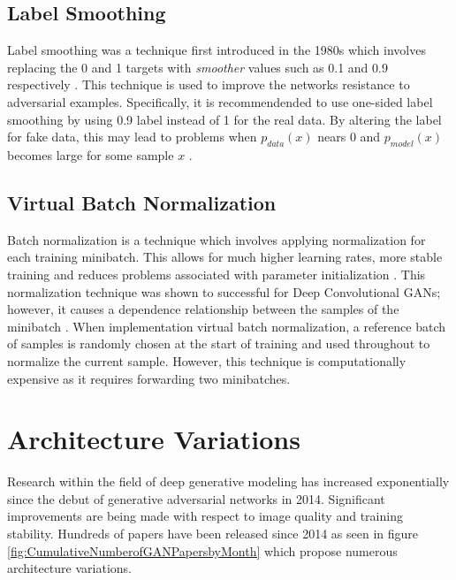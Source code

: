 \documentclass[11pt]{article}
\begin{document}
\subsection{Label Smoothing}
Label smoothing was a technique first introduced in the 1980s which involves replacing the 0 and 1 targets with \textit{smoother} values such as 0.1 and 0.9 respectively \citep{2016arXiv160603498S}. This technique is used to improve the networks resistance to adversarial examples. Specifically, it is recommendended to use one-sided label smoothing by using 0.9 label instead of 1 for the real data. By altering the label for fake data, this may lead to problems when $p_{data}(x)$ nears $0$ and $p_{model}(x)$ becomes large for some sample $x$ \citep{2016arXiv160603498S}.

\subsection{Virtual Batch Normalization}
Batch normalization is a technique which involves applying normalization for each training minibatch. This allows for much higher learning rates, more stable training and reduces problems associated with parameter initialization \citep{2015arXiv150203167I}. This normalization technique was shown to successful for Deep Convolutional GANs; however, it causes a dependence relationship between the samples of the minibatch \citep{2016arXiv160603498S}. When implementation virtual batch normalization, a reference batch of samples is randomly chosen at the start of training and used throughout to normalize the current sample. However, this technique is computationally expensive as it requires forwarding two minibatches.

\section{Architecture Variations}
Research within the field of deep generative modeling has increased exponentially since the debut of generative adversarial networks in 2014. Significant improvements are being made with respect to image quality and training stability. Hundreds of papers have been released since 2014 as seen in figure \ref{fig:CumulativeNumberofGANPapersbyMonth} which propose numerous architecture variations.
\end{document}
